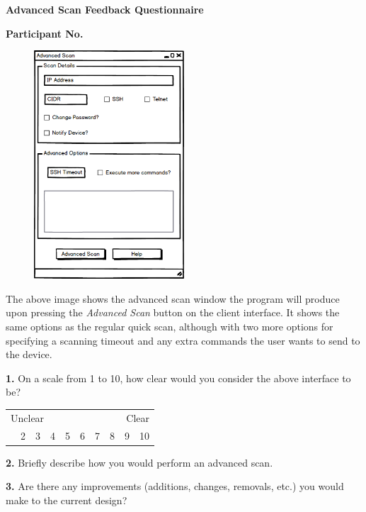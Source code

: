 \begin{center}
	\textbf{Advanced Scan Feedback Questionnaire}\par
	\textbf{Participant No.}\par
\end{center}

\vspace{0.5cm}

\begin{figure}[h]
\begin{center}
	\includegraphics[width=0.5\textwidth]{img/advanced_scan_mockup.png}
\end{center}
\end{figure}

\vspace{0.5cm}

The above image shows the advanced scan window the program will produce upon pressing the \textit{Advanced Scan} button on
the client interface. It shows the same options as the regular quick scan, although with two more options for specifying a
scanning timeout and any extra commands the user wants to send to the device.

\vspace{0.5cm}

\textbf{1.} On a scale from 1 to 10, how clear would you consider the above interface to be?

\begin{center}
	\begin{table}[h]
	\label{my-label}
	\begin{tabularx}{\textwidth}{XXXXXXXXXX}
	\multicolumn{5}{l}{Unclear} & \multicolumn{5}{r}{Clear} \\
	\centering
	1    & 2    & 3    & 4    & 5    & 6    & 7    & 8    & 9    & 10
	\end{tabularx}
	\end{table}
\end{center}

\textbf{2.} Briefly describe how you would perform an advanced scan.

\vspace{5cm}

\textbf{3.} Are there any improvements (additions, changes, removals, etc.) you would make to the current design?

\vspace{5cm}
